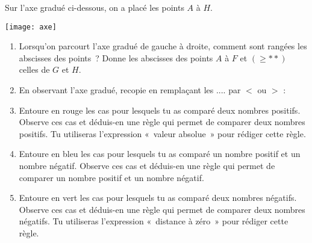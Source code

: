 
\begin{activite}
Sur l'axe gradué ci-dessous, on a placé les points $A$ à $H$.

\begin{center} \texttt{[image: axe]} \end{center}

 \begin{enumerate}
  \item Lorsqu'on parcourt l'axe gradué de gauche à droite, comment sont rangées les abscisses des points ? Donne les abscisses des points $A$ à $F$ et \textcolor{H1}{$(\geq\ast\ast)$} celles de $G$ et $H$.
  \item En observant l'axe gradué, recopie en remplaçant les .... par $<$ ou $>$ :
  \item Entoure en rouge les cas pour lesquels tu as comparé deux nombres positifs. Observe ces cas et déduis-en une règle qui permet de comparer deux nombres positifs. Tu utiliseras l'expression « valeur absolue » pour rédiger cette règle. 
  \item Entoure en bleu les cas pour lesquels tu as comparé un nombre positif et un nombre négatif. Observe ces cas et déduis-en une règle qui permet de comparer un nombre positif et un nombre négatif.
  \item Entoure en vert les cas pour lesquels tu as comparé deux nombres négatifs. Observe ces cas et déduis-en une règle qui permet de comparer deux nombres négatifs. Tu utiliseras l'expression « distance à zéro » pour rédiger cette règle.
  \end{enumerate}
  
\end{activite}

